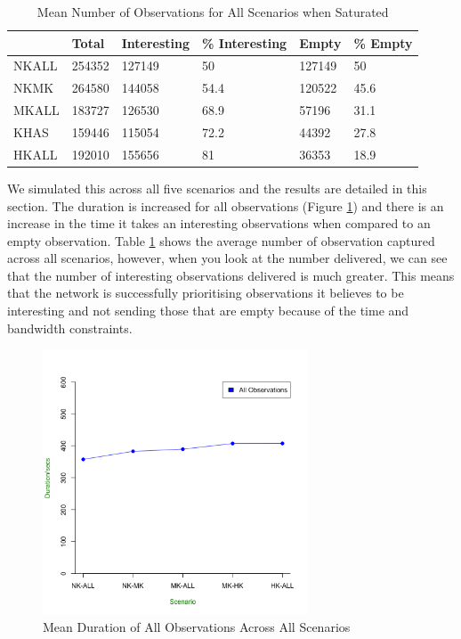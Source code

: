 \begin{table}[h]
\centering
\begin{tabular}{|l|l|l|l|l|l|}
\hline
      & Total  & Interesting & \% Interesting & Empty  & \% Empty \\
\hline
NKALL & 254352 & 127149      & 50           & 127149 & 50     \\
NKMK  & 264580 & 144058      & 54.4         & 120522 & 45.6     \\
MKALL & 183727 & 126530      & 68.9           & 57196  & 31.1     \\
KHAS  & 159446 & 115054      & 72.2           & 44392  & 27.8     \\
HKALL & 192010 & 155656      & 81             & 36353  & 18.9     \\
\hline
\end{tabular}
\caption{Mean Number of Observations for All Scenarios when Saturated}
\label{sim:tab:satur}
\end{table}

We simulated this across all five scenarios and the results are detailed in this section. The duration is increased for all observations (Figure \ref{fig:sat:total:dur}) and there is an increase in the time it takes an interesting observations when compared to an empty observation. Table \ref{sim:tab:satur} shows the average number of observation captured across all scenarios, however, when you look at the number delivered, we can see that the number of interesting observations delivered is much greater. This means that the network is successfully prioritising observations it believes to be interesting and not sending those that are empty because of the time and bandwidth constraints.

	\begin{figure}[ht!]
	\centering
	\includegraphics[width=0.7\textwidth]{Chap7/figures/saturated/all_total}
	\caption{Mean Duration of All Observations Across All Scenarios}
	\label{fig:sat:total:dur}
	\end{figure}

